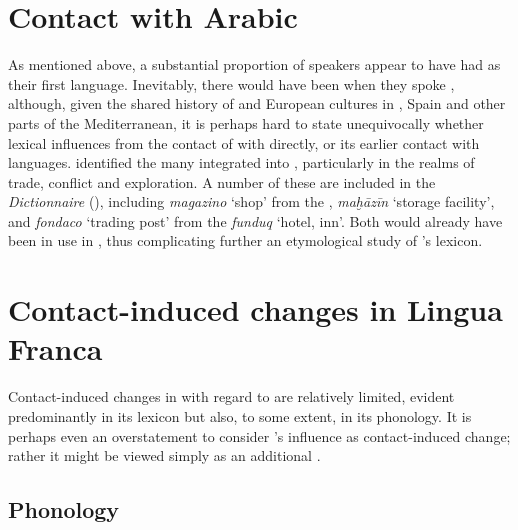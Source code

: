 \documentclass[output=paper]{langsci/langscibook}
\begin{document}
 \section{Contact with Arabic}
	
	As mentioned above, a substantial proportion of  speakers appear to have had  as their first language. Inevitably, there would have been  when they spoke , although, given the shared history of  and European cultures in , Spain and other parts of the Mediterranean, it is perhaps hard to state unequivocally whether lexical influences  from the contact of  with  directly, or its earlier contact with  languages. \citet{Pellegrini1972} identified the many   integrated into , particularly in the realms of trade, conflict and exploration. A number of these are included in the \textit{Dictionnaire} (\citeyear{Anonymous1830}), including \textit{magazino} ‘shop’ from the , \textit{maḫāzīn} ‘storage facility’, and \textit{fondaco} ‘trading post’ from the  \textit{funduq} ‘hotel, inn’. Both would already have been in use in , thus complicating further an etymological study of ’s lexicon.
	

\section{Contact-induced changes in Lingua Franca}
	
	Contact-induced changes in  with regard to  are relatively limited, evident predominantly in its lexicon but also, to some extent, in its phonology. It is perhaps even an overstatement to consider ’s influence as contact-induced change; rather it might be viewed simply as an additional .
	
\subsection{Phonology}
	
\end{document}
